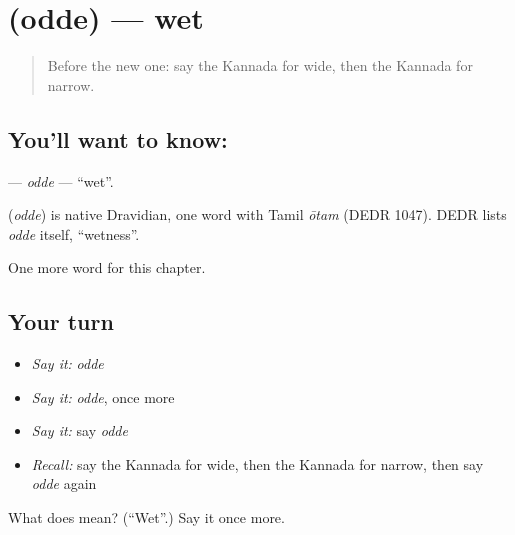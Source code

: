 \section[\texorpdfstring{\kn{ಒದ್ದೆ} (odde)}{ಒದ್ದೆ (odde)}]{ (odde) — wet}

\label{lesson:KA-C142-odde}



\begin{quote}
Before the new one: say the Kannada for wide, then the Kannada for narrow.
\end{quote}

\subsection*{You'll want to know: }
\textbf{} — \emph{odde} — \textquotedblleft{}wet\textquotedblright{}.

\begin{cousinweb}
\textbf{} (\emph{odde}) is native Dravidian, one word with Tamil \emph{ōtam} (DEDR 1047). DEDR lists \emph{odde} itself, \textquotedblleft{}wetness\textquotedblright{}.
\end{cousinweb}

\begin{grammarlens}[title={What you've built}]
One more word for this chapter.
\end{grammarlens}

\subsection*{Your turn}
\begin{itemize}
\raggedright
  \item \emph{Say it:} \emph{odde}
  \item \emph{Say it:} \emph{odde}, once more
  \item \emph{Say it:} say \emph{odde}
  \item \emph{Recall:} say the Kannada for wide, then the Kannada for narrow, then say \emph{odde} again
\end{itemize}

\begin{tcolorbox}[breakable,colback=teal!4,colframe=teal!35!black,title={Before you move on}]
What does  mean? (\textquotedblleft{}Wet\textquotedblright{}.) Say it once more.
\end{tcolorbox}
